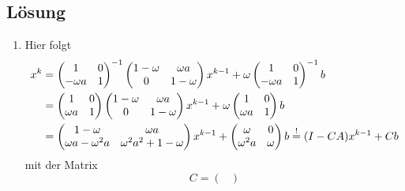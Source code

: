 \documentclass{exercise}
\begin{document}
    \subsection*{Lösung}
    \begin{enumerate}
        \item Hier folgt
        \begin{align*}
            x^k &= \begin{pmatrix}
                1 & 0\\
                -\omega a & 1
            \end{pmatrix}^{-1}\begin{pmatrix}
                1 - \omega & \omega a\\
                0 & 1 - \omega
            \end{pmatrix}x^{k - 1} + \omega\begin{pmatrix}
                1 & 0\\
                -\omega a & 1
            \end{pmatrix}^{-1}b\\
            &= \begin{pmatrix}
                1 & 0\\
                \omega a & 1
            \end{pmatrix}\begin{pmatrix}
                1 - \omega & \omega a\\
                0 & 1 - \omega
            \end{pmatrix}x^{k - 1} + \omega\begin{pmatrix}
                1 & 0\\
                \omega a & 1
            \end{pmatrix}b\\
            &= \begin{pmatrix}
                1 - \omega & \omega a\\
                \omega a - \omega^2 a & \omega^2 a^2 + 1 - \omega
            \end{pmatrix}x^{k - 1} + \begin{pmatrix}
                \omega & 0\\
                \omega^2 a & \omega
            \end{pmatrix}b \stackrel{!}{=} \parentheses*{I - CA}x^{k - 1} + Cb
        \end{align*}
        mit der Matrix
        \[
            C = \begin{pmatrix}

\end{pmatrix}\]
\end{enumerate}
\end{document}
